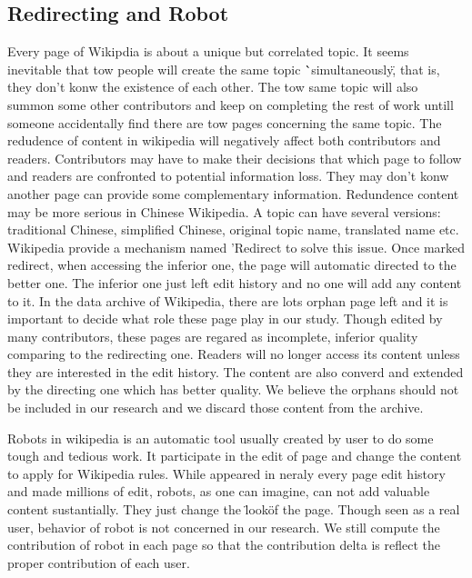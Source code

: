 \documentclass{elsarticle}
\begin{document}

\subsection{Redirecting and Robot}
\label{sec:redirecting-robot}

Every page of Wikipdia is about a unique but correlated topic. It
seems inevitable that tow people will create the same topic
\``simultaneously\", that is, they don't konw the existence of each
other. The tow same topic will also summon some other contributors and
keep on completing the rest of work untill someone accidentally find
there are tow pages concerning the same topic. The redudence of
content in wikipedia will negatively affect both contributors and
readers. Contributors may have to make their decisions that  which
page to follow and readers are confronted to potential information
loss. They may don't konw another page can provide some complementary
information. Redundence content may be more serious in Chinese
Wikipedia. A topic can have several versions: traditional Chinese,
simplified Chinese, original topic name, translated name
etc. Wikipedia provide a mechanism named 'Redirect  \cite{wikiredirect}
to solve this issue.  Once marked redirect, when accessing the inferior one, the page will
automatic directed to the better one. The inferior one just left edit
history and no one will add any content to it. In the data archive of
Wikipedia, there are lots orphan page left and it is important to
decide what role these page play in our study. Though edited by many
contributors, these pages are regared as incomplete, inferior quality
comparing to the redirecting one. Readers will no longer access its
content unless they are interested in the edit history. The content
are also converd and extended by the directing one which has better quality. We believe the
orphans should not be included in our research and we discard those
content from the archive.

Robots in wikipedia is an automatic tool usually created by user to do
some tough and tedious work. It participate in the edit of page and
change the content to apply for Wikipedia rules. While appeared in
neraly every page edit history and made millions of edit, robots, as
one can imagine, can not add valuable content sustantially. They just
change the \"look\" of the page. Though seen as a real user, behavior
of robot is not concerned in our research. We still compute the
contribution of robot in each page so that the contribution delta is
reflect the proper contribution of  each user.
 
\end{document}

